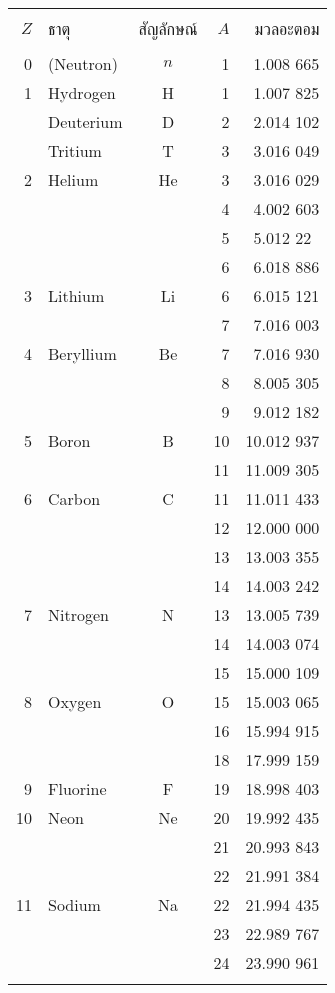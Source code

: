 \begin{tabular}[!ht]{rlcrr}
\hline\\
$Z$&ธาตุ&สัญลักษณ์&$A$&มวลอะตอม\\
\hline\\
0&(Neutron)&$n$&1&1.008 665\\
1&Hydrogen&H&1&1.007 825\\
&Deuterium&D&2&2.014 102\\
&Tritium&T&3&3.016 049\\
2&Helium&He&3&3.016 029\\
&&&4&4.002 603\\
&&&5&5.012 22\mbox{ }\\
&&&6&6.018 886\\
3&Lithium&Li&6&6.015 121\\
&&&7&7.016 003\\
4&Beryllium&Be&7&7.016 930\\
&&&8&8.005 305\\
&&&9&9.012 182\\
5&Boron&B&10&10.012 937\\
&&&11&11.009 305\\
6&Carbon&C&11&11.011 433\\
&&&12&12.000 000\\
&&&13&13.003 355\\
&&&14&14.003 242\\
7&Nitrogen&N&13&13.005 739\\
&&&14&14.003 074\\
&&&15&15.000 109\\
8&Oxygen&O&15&15.003 065\\
&&&16&15.994 915\\
&&&18&17.999 159\\
9&Fluorine&F&19&18.998 403\\
10&Neon&Ne&20&19.992 435\\
&&&21&20.993 843\\
&&&22&21.991 384\\
11&Sodium&Na&22&21.994 435\\
&&&23&22.989 767\\
&&&24&23.990 961\\\\
\hline
\end{tabular}

